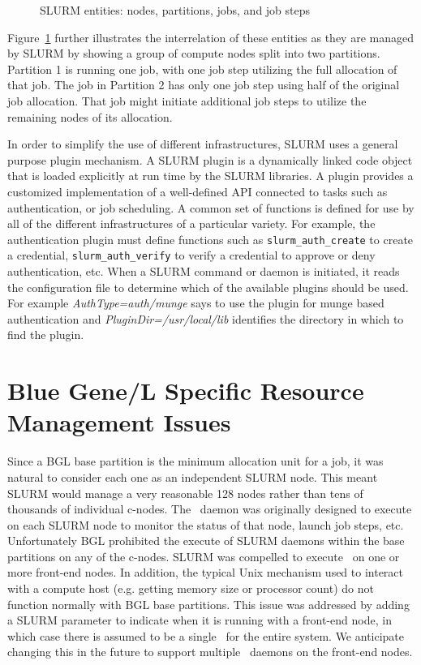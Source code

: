 \documentclass[10pt,onecolumn,times]{../common/llncs}
\begin{document}
{\begin{figure}[tcb]
\centerline{}
\caption{\small SLURM entities: nodes, partitions, jobs, and job steps}
\label{entities}
\end{figure}

Figure~\ref{entities} further illustrates the interrelation of these
entities as they are managed by SLURM by showing a group of
compute nodes split into two partitions. Partition 1 is running one job,
with one job step utilizing the full allocation of that job.  The job
in Partition 2 has only one job step using half of the original job
allocation.  That job might initiate additional job steps to utilize
the remaining nodes of its allocation.

In order to simplify the use of different infrastructures,
SLURM uses a general purpose plugin mechanism.  A SLURM plugin is a
dynamically linked code object that is loaded explicitly at run time
by the SLURM libraries.  A plugin provides a customized implementation
of a well-defined API connected to tasks such as authentication,
or job scheduling.  A common set of functions is defined
for use by all of the different infrastructures of a particular variety.
For example, the authentication plugin must define functions such as
{\tt slurm\_auth\_create} to create a credential, {\tt slurm\_auth\_verify}
to verify a credential to approve or deny authentication, etc.
When a SLURM command or daemon is initiated, it
reads the configuration file to determine which of the available plugins
should be used.  For example {\em AuthType=auth/munge} says to use the
plugin for munge based authentication and {\em PluginDir=/usr/local/lib}
identifies the directory in which to find the plugin.

\section {Blue Gene/L Specific Resource Management Issues}

Since a BGL base partition is the minimum allocation unit for a job,
it was natural to consider each one as an independent SLURM node.
This meant SLURM would manage a very reasonable 128 nodes
rather than tens of thousands of individual c-nodes.
The \slurmd\ daemon was originally designed to execute on each
SLURM node to monitor the status of that node, launch job steps, etc.
Unfortunately BGL prohibited the execute of SLURM daemons within
the base partitions on any of the c-nodes.
SLURM was compelled to execute \slurmd\ on one or more
front-end nodes.
In addition,  the typical Unix mechanism used to interact with a
compute host (e.g. getting memory size or processor count) do not
function normally with BGL base partitions.
This issue was addressed by adding a SLURM parameter to
indicate when it is running with a front-end node, in which case
there is assumed to be a single \slurmd\ for the entire system.
We anticipate changing this in the future to support multiple
\slurmd\ daemons on the front-end nodes.

}
\end{document}
